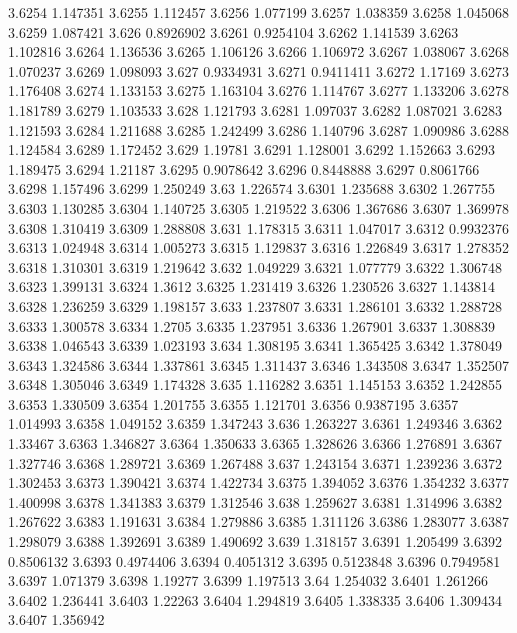 3.6254  1.147351
3.6255  1.112457
3.6256  1.077199
3.6257  1.038359
3.6258  1.045068
3.6259  1.087421
3.626  0.8926902
3.6261  0.9254104
3.6262  1.141539
3.6263  1.102816
3.6264  1.136536
3.6265  1.106126
3.6266  1.106972
3.6267  1.038067
3.6268  1.070237
3.6269  1.098093
3.627  0.9334931
3.6271  0.9411411
3.6272  1.17169
3.6273  1.176408
3.6274  1.133153
3.6275  1.163104
3.6276  1.114767
3.6277  1.133206
3.6278  1.181789
3.6279  1.103533
3.628  1.121793
3.6281  1.097037
3.6282  1.087021
3.6283  1.121593
3.6284  1.211688
3.6285  1.242499
3.6286  1.140796
3.6287  1.090986
3.6288  1.124584
3.6289  1.172452
3.629  1.19781
3.6291  1.128001
3.6292  1.152663
3.6293  1.189475
3.6294  1.21187
3.6295  0.9078642
3.6296  0.8448888
3.6297  0.8061766
3.6298  1.157496
3.6299  1.250249
3.63  1.226574
3.6301  1.235688
3.6302  1.267755
3.6303  1.130285
3.6304  1.140725
3.6305  1.219522
3.6306  1.367686
3.6307  1.369978
3.6308  1.310419
3.6309  1.288808
3.631  1.178315
3.6311  1.047017
3.6312  0.9932376
3.6313  1.024948
3.6314  1.005273
3.6315  1.129837
3.6316  1.226849
3.6317  1.278352
3.6318  1.310301
3.6319  1.219642
3.632  1.049229
3.6321  1.077779
3.6322  1.306748
3.6323  1.399131
3.6324  1.3612
3.6325  1.231419
3.6326  1.230526
3.6327  1.143814
3.6328  1.236259
3.6329  1.198157
3.633  1.237807
3.6331  1.286101
3.6332  1.288728
3.6333  1.300578
3.6334  1.2705
3.6335  1.237951
3.6336  1.267901
3.6337  1.308839
3.6338  1.046543
3.6339  1.023193
3.634  1.308195
3.6341  1.365425
3.6342  1.378049
3.6343  1.324586
3.6344  1.337861
3.6345  1.311437
3.6346  1.343508
3.6347  1.352507
3.6348  1.305046
3.6349  1.174328
3.635  1.116282
3.6351  1.145153
3.6352  1.242855
3.6353  1.330509
3.6354  1.201755
3.6355  1.121701
3.6356  0.9387195
3.6357  1.014993
3.6358  1.049152
3.6359  1.347243
3.636  1.263227
3.6361  1.249346
3.6362  1.33467
3.6363  1.346827
3.6364  1.350633
3.6365  1.328626
3.6366  1.276891
3.6367  1.327746
3.6368  1.289721
3.6369  1.267488
3.637  1.243154
3.6371  1.239236
3.6372  1.302453
3.6373  1.390421
3.6374  1.422734
3.6375  1.394052
3.6376  1.354232
3.6377  1.400998
3.6378  1.341383
3.6379  1.312546
3.638  1.259627
3.6381  1.314996
3.6382  1.267622
3.6383  1.191631
3.6384  1.279886
3.6385  1.311126
3.6386  1.283077
3.6387  1.298079
3.6388  1.392691
3.6389  1.490692
3.639  1.318157
3.6391  1.205499
3.6392  0.8506132
3.6393  0.4974406
3.6394  0.4051312
3.6395  0.5123848
3.6396  0.7949581
3.6397  1.071379
3.6398  1.19277
3.6399  1.197513
3.64  1.254032
3.6401  1.261266
3.6402  1.236441
3.6403  1.22263
3.6404  1.294819
3.6405  1.338335
3.6406  1.309434
3.6407  1.356942
